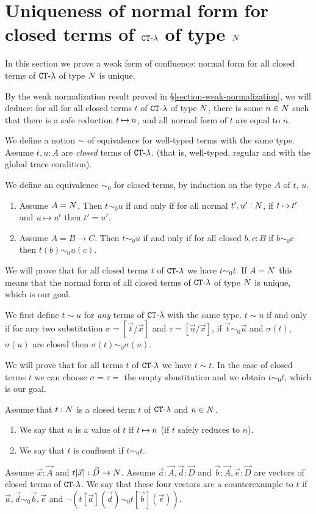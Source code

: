 \documentclass{article}
\begin{document}

\section{Uniqueness of normal form for closed terms of ${ {\tt CT} \mbox{-} \lambda}$ of type ${N}$}
In this section we prove a weak form of confluence: normal form for
all closed terms of ${ {\tt CT} \mbox{-} \lambda}$ of type ${N}$ is unique.

By the weak normalization result proved in \S  \ref{section-weak-normalization},
we will deduce: for all for all closed terms $t$ of ${ {\tt CT} \mbox{-} \lambda}$ of type ${N}$, 
there is some $n \in {N}$ such that there is a safe reduction $t \mathbin{\mapsto} n$, and all normal form of $t$
are equal to $n$.

We define a notion $\sim$ of equivalence for well-typed terms with the same type.
Assume $t, u : A$ are \emph{closed} terms of ${ {\tt CT} \mbox{-} \lambda}$.
 (that is, well-typed, regular and with the global trace condition). 

We define an equivalence $\sim_0$ for closed terms,
by induction on the type $A$ of $t$, $u$.

\begin{enumerate}
\item
Assume $A = {N}$. Then $t \sim_0 u$ if and only if for all normal $t',u':{N}$, if $t \mathbin{\mapsto} t'$
and $u \mathbin{\mapsto} u'$ then $t'=u'$.
\item
Assume $A = B \rightarrow C$. Then $t \sim_0 u$ if and only if for all closed $b,c:B$ if
$b \sim_0 c$ then $t(b) \sim_0 u(c)$.
\end{enumerate}

We will prove that for all closed terms $t$ of ${ {\tt CT} \mbox{-} \lambda}$ we have $t \sim_0 t$.
If $A={N}$ this means that the normal form of all closed terms of ${ {\tt CT} \mbox{-} \lambda}$ of type ${N}$ is unique,
which is our goal.

We first define $t \sim u$ for \emph{any} terms of ${ {\tt CT} \mbox{-} \lambda}$ with the same type.
 $t \sim u$ if and only if for any two substitution 
$\sigma = [\vec{t} / \vec{x}]$ and $\tau = [\vec{u} / \vec{x}]$,
if $\vec{t} \sim_0 \vec{u}$ and $\sigma(t)$, $\sigma(u)$ are closed then $\sigma(t) \sim_0 \sigma(u)$.

We will prove that  for all terms $t$ of ${ {\tt CT} \mbox{-} \lambda}$ we have $t \sim t$. In the case of closed terms $t$
we can choose $\sigma=\tau=$ the empty sbustitution and we obtain $t \sim_0 t$, which is our goal.

Assume that $t:{N}$ is a closed term $t$ of ${ {\tt CT} \mbox{-} \lambda}$ and $n \in {N}$. 
\begin{enumerate}
\item
We say that $n$ is a value of $t$ if $t \mathbin{\mapsto} n$ (if $t$ safely reduces to $n$). 
\item
We say that $t$ is confluent if $t \sim_0 t$.
\end{enumerate}
Assume $\vec{x}:\vec{A}$ and $t[\vec{x}]: \vec{D} \rightarrow {N}$. Assume 
$\vec{a}:\vec{A},\vec{d}:\vec{D}$ 
and $\vec{b}:\vec{A},\vec{e}:\vec{D}$ are vectors of closed terms of ${ {\tt CT} \mbox{-} \lambda}$. We say that 
these four vectors are a counterexample to $t$ if $\vec{a},\vec{d} \sim_0 \vec{b},\vec{e}$
and $\neg (t[\vec{a}](\vec{d}) \sim_0  t[\vec{b}](\vec{e}))$.
\end{document}
